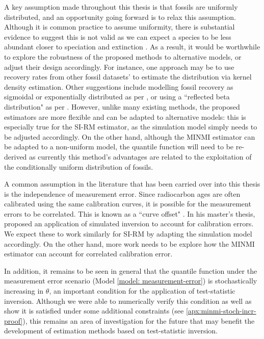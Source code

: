 A key assumption made throughout this thesis is that fossils are uniformly distributed, and an opportunity going forward is to relax this assumption. Although it is common practice to assume uniformity, there is substantial evidence to suggest this is not valid as we can expect a species to be less abundant closer to speciation and extinction \cite{Lee2010, WangMarshall2016}. As a result, it would be worthwhile to explore the robustness of the proposed methods to alternative models, or adjust their design accordingly. For instance, one approach may be to use recovery rates from other fossil datasets' to estimate the distribution via kernel density estimation. Other suggestions include modelling fossil recovery as sigmoidal or exponentially distributed as per \citet{Bradshaw2012}, or using a ``reflected beta distribution" as per \citet{Wang2016}. However, unlike many existing methods, the proposed estimators are more flexible and can be adapted to alternative models: this is especially true for the SI-RM estimator, as the simulation model simply needs to be adjusted accordingly. On the other hand, although the MINMI estimator can be adapted to a non-uniform model, the quantile function will need to be re-derived as currently this method's advantages are related to the exploitation of the conditionally uniform distribution of fossils.

A common assumption in the literature that has been carried over into this thesis is the independence of measurement error. Since radiocarbon ages are often calibrated using the same calibration curves, it is possible for the measurement errors to be correlated. This is known as a ``curve offset" \cite{Ramsey2010}. In his master's thesis, \citet{King2020} proposed an application of simulated inversion to account for calibration errors. We expect these to work similarly for SI-RM by adapting the simulation model accordingly. On the other hand, more work needs to be explore how the MINMI estimator can account for correlated calibration error.

In addition, it remains to be seen in general that the quantile function under the measurement error scenario (Model \ref{model: measurement-error}) is stochastically increasing in $\theta$, an important condition for the application of test-statistic inversion. Although we were able to numerically verify this condition as well as show it is satisfied under some additional constraints (see \autoref{apx:minmi-stoch-incr-proof}), this remains an area of investigation for the future that may benefit the development of estimation methods based on test-statistic inversion.

